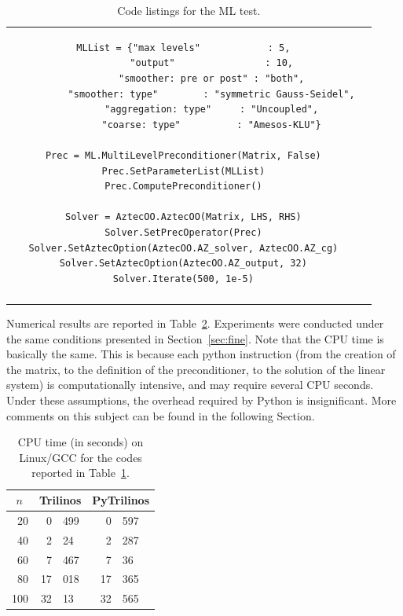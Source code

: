 \documentclass[acmtocl]{acmtrans2m}
\begin{document}
\begin{table}
\begin{tabular}{| c  | c|}
\begin{minipage}{9cm}
\begin{verbatim}
MLList = {"max levels"            : 5,
          "output"                : 10,
          "smoother: pre or post" : "both",
          "smoother: type"        : "symmetric Gauss-Seidel",
          "aggregation: type"     : "Uncoupled",
          "coarse: type"          : "Amesos-KLU"}

Prec = ML.MultiLevelPreconditioner(Matrix, False)
Prec.SetParameterList(MLList)
Prec.ComputePreconditioner()

Solver = AztecOO.AztecOO(Matrix, LHS, RHS)
Solver.SetPrecOperator(Prec)
Solver.SetAztecOption(AztecOO.AZ_solver, AztecOO.AZ_cg)
Solver.SetAztecOption(AztecOO.AZ_output, 32)
Solver.Iterate(500, 1e-5)
\end{verbatim}
    \end{minipage}
    \\
    &  \\
    \hline
  \end{tabular}
  \caption{Code listings for the ML test.}
  \label{tab:code_ml}
\end{table}

Numerical results are reported in Table~\ref{tab:time_ml}.
Experiments were conducted under the same conditions presented in
Section~\ref{sec:fine}.  Note that the CPU time is basically the same.
This is because each python instruction (from the creation of the
matrix, to the definition of the preconditioner, to the solution of
the linear system) is computationally intensive, and may require
several CPU seconds.  Under these assumptions, the overhead required
by Python is insignificant.  More comments on this subject can be
found in the following Section.

\begin{table}
  \begin{center}
    \begin{tabular}{|r|r@{.}l|r@{.}l|}
      \hline
      \tt $n$ & \multicolumn{2}{c|}{Trilinos} &
      \multicolumn{2}{c|}{PyTrilinos} \\
      \hline
       20 &  0&499 &  0&597 \\
       40 &  2&24  &  2&287 \\
       60 &  7&467 &  7&36  \\
       80 & 17&018 & 17&365 \\
      100 & 32&13  & 32&565 \\
      \hline
    \end{tabular}
    \caption{CPU time (in seconds) on Linux/GCC for the codes reported
      in Table~\ref{tab:code_ml}.}
    \label{tab:time_ml}
  \end{center}
\end{table}
\end{document}

